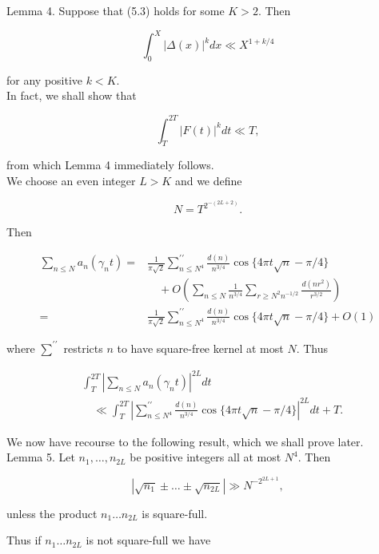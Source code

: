 \documentclass[10pt]{article}
\begin{document}
Lemma 4. Suppose that (5.3) holds for some $K>2$. Then

$$
\int_{0}^{X}|\Delta(x)|^{k} d x \ll X^{1+k / 4}
$$

for any positive $k<K$.\\
In fact, we shall show that

$$
\int_{T}^{2 T}|F(t)|^{k} d t \ll T,
$$

from which Lemma 4 immediately follows.\\
We choose an even integer $L>K$ and we define


\begin{equation*}
N=T^{2^{-(2 L+2)}}. \tag{5.4}
\end{equation*}


Then

$$
\begin{aligned}
\sum_{n \leq N} a_{n}\left(\gamma_{n} t\right)= & \frac{1}{\pi \sqrt{2}} \sum_{n \leq N^{4}}^{\prime \prime} \frac{d(n)}{n^{3 / 4}} \cos \{4 \pi t \sqrt{n}-\pi / 4\} \\
& \quad+O\left(\sum_{n \leq N} \frac{1}{n^{3 / 4}} \sum_{r \geq N^{2} n^{-1 / 2}} \frac{d\left(n r^{2}\right)}{r^{3 / 2}}\right) \\
= & \frac{1}{\pi \sqrt{2}} \sum_{n \leq N^{4}}^{\prime \prime} \frac{d(n)}{n^{3 / 4}} \cos \{4 \pi t \sqrt{n}-\pi / 4\}+O(1)
\end{aligned}
$$

where $\sum^{\prime \prime}$ restricts $n$ to have square-free kernel at most $N$. Thus


\begin{align*}
& \int_{T}^{2 T}\left|\sum_{n \leq N} a_{n}\left(\gamma_{n} t\right)\right|^{2 L} d t  \tag{5.5}\\
& \quad \ll \int_{T}^{2 T}\left|\sum_{n \leq N^{4}}^{\prime \prime} \frac{d(n)}{n^{3 / 4}} \cos \{4 \pi t \sqrt{n}-\pi / 4\}\right|^{2 L} d t+T.
\end{align*}


We now have recourse to the following result, which we shall prove later.\\
Lemma 5. Let $n_{1}, \ldots, n_{2 L}$ be positive integers all at most $N^{4}$. Then

$$
\left|\sqrt{n_{1}} \pm \ldots \pm \sqrt{n_{2 L}}\right| \gg N^{-2^{2 L+1}},
$$

unless the product $n_{1} \ldots n_{2 L}$ is square-full.

Thus if $n_{1} \ldots n_{2 L}$ is not square-full we have
\end{document}
